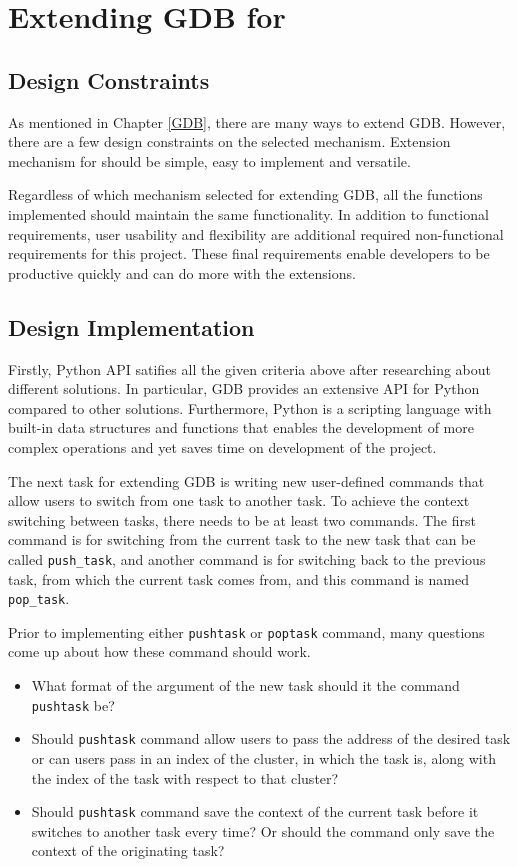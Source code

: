 \chapter{Extending GDB for \uCPP}
\section{Design Constraints}
As mentioned in Chapter \ref{GDB}, there are many ways to extend GDB. However,
there are a few design constraints on the selected mechanism. Extension
mechanism for \uCPPS should be simple, easy to implement and versatile.

Regardless of which mechanism selected for extending GDB, all the functions
implemented should maintain the same functionality. In addition to functional
requirements, user usability and flexibility are additional required
non-functional requirements for this
project. These final requirements enable developers to be productive quickly
and can do more with the extensions.

\section{Design Implementation}
Firstly, Python API satifies all the given criteria above after researching
about different solutions. In particular, GDB provides an extensive API for
Python compared to other solutions. Furthermore, Python is a scripting language with built-in
data structures and functions that enables the development of more complex
operations and yet saves time on development of the project.

The next task for extending GDB is writing new user-defined commands that allow
users to switch from one task to another task. To achieve the context switching
between tasks, there needs to be at least two commands. The first command is for switching from the current task to
the new task that can be called \verb|push_task|, and another command
is for switching back to the previous task, from which the current task comes
from, and this command is named \verb|pop_task|.

Prior to implementing either \verb|pushtask| or \verb|poptask| command, many questions come up about how
these command should work.
\begin{itemize}
\item What format of the argument of the new task should it the command
\verb|pushtask| be?
\item Should \verb|pushtask| command allow users to pass the address of the desired task or can users
pass in an index of the cluster, in which the task is, along with the index of
the task with respect to that cluster?
\item Should \verb|pushtask| command save the context of the current task before it switches to
another task every time? Or should the command only save the context of the
originating task?
\end{itemize}

